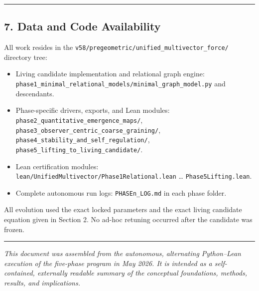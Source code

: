 \documentclass[
  11pt,
  a4paper,
]{article}
\providecommand{\tightlist}{%
  \setlength{\itemsep}{0pt}\setlength{\parskip}{0pt}}
\begin{document}
\begin{center}\rule{0.5\linewidth}{0.5pt}\end{center}

\subsection{7. Data and Code
Availability}\label{data-and-code-availability}

All work resides in the
\texttt{v58/pregeometric/unified\_multivector\_force/} directory tree:

\begin{itemize}
\tightlist
\item
  Living candidate implementation and relational graph engine:
  \texttt{phase1\_minimal\_relational\_models/minimal\_graph\_model.py}
  and descendants.
\item
  Phase-specific drivers, exports, and Lean modules:
  \texttt{phase2\_quantitative\_emergence\_maps/},
  \texttt{phase3\_observer\_centric\_coarse\_graining/},
  \texttt{phase4\_stability\_and\_self\_regulation/},
  \texttt{phase5\_lifting\_to\_living\_candidate/}.
\item
  Lean certification modules:
  \texttt{lean/UnifiedMultivector/Phase1Relational.lean} \ldots{}
  \texttt{Phase5Lifting.lean}.
\item
  Complete autonomous run logs: \texttt{PHASEn\_LOG.md} in each phase
  folder.
\end{itemize}

All evolution used the exact locked parameters and the exact living
candidate equation given in Section 2. No ad-hoc retuning occurred after
the candidate was frozen.

\begin{center}\rule{0.5\linewidth}{0.5pt}\end{center}

\emph{This document was assembled from the autonomous, alternating
Python--Lean execution of the five-phase program in May 2026. It is
intended as a self-contained, externally readable summary of the
conceptual foundations, methods, results, and implications.}
\end{document}
